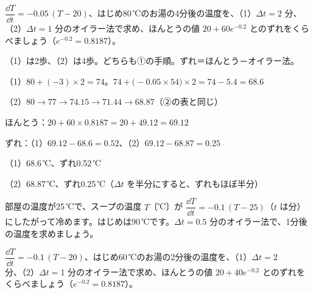 \begin{reidai}
$\dfrac{\dd T}{\dd t}=-0.05\,(T-20)$、はじめ80\,℃のお湯の4分後の温度を、（1）$\Delta t=2$ 分、（2）$\Delta t=1$ 分のオイラー法で求め、ほんとうの値 $20+60e^{-0.2}$ とのずれをくらべましょう（$e^{-0.2}=0.8187$）。\par
\kangaekata （1）は2歩、（2）は4歩。どちらも①の手順。ずれ＝ほんとう－オイラー法。\par
\shiki（1）$80+(-3)\times2=74$。$74+\bigl(-0.05\times54\bigr)\times2=74-5.4=68.6$\par
\bkvicl（2）$80\to77\to74.15\to71.44\to68.87$（②の表と同じ）\par
\bkvicl ほんとう：$20+60\times0.8187=20+49.12=69.12$\par
\bkvicl ずれ：（1）$69.12-68.6=0.52$、（2）$69.12-68.87=0.25$\par
\kotae（1）68.6\,℃、ずれ0.52\,℃\par
\bkvicl（2）68.87\,℃、ずれ0.25\,℃（$\Delta t$ を半分にすると、ずれもほぼ半分）
\end{reidai}

\begingroup{}%
\noindent\begin{minipage}[t]{0.49\linewidth}
\begin{jibun}
\raggedright 部屋の温度が25\,℃で、スープの温度 $T$〔℃〕が $\dfrac{\dd T}{\dd t}=-0.1\,(T-25)$（$t$ は分）にしたがって冷めます。はじめは90\,℃です。$\Delta t=0.5$ 分のオイラー法で、1分後の温度を求めましょう。
\end{jibun}
\end{minipage}\hfill
\begin{minipage}[t]{0.49\linewidth}
\begin{jibun}
\raggedright $\dfrac{\dd T}{\dd t}=-0.1\,(T-20)$、はじめ60\,℃のお湯の2分後の温度を、（1）$\Delta t=2$ 分、（2）$\Delta t=1$ 分のオイラー法で求め、ほんとうの値 $20+40e^{-0.2}$ とのずれをくらべましょう（$e^{-0.2}=0.8187$）。
\end{jibun}
\end{minipage}\par
\endgroup

